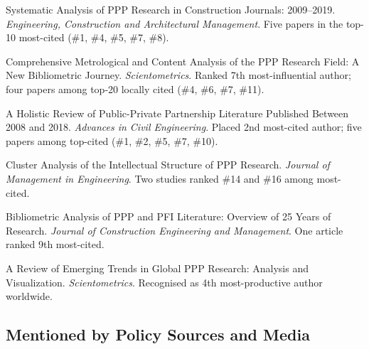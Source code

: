\documentclass[11pt,a4paper]{report} %
\begin{document}
\begin{tablist}
        \item[2020] \tab{}Systematic Analysis of PPP Research in Construction Journals: 2009--2019. \textit{Engineering, Construction and Architectural Management}. Five papers in the top-10 most-cited (\#1, \#4, \#5, \#7, \#8).  
    
        \item[2020] \tab{}Comprehensive Metrological and Content Analysis of the PPP Research Field: A New Bibliometric Journey. \textit{Scientometrics}. Ranked 7th most-influential author; four papers among top-20 locally cited (\#4, \#6, \#7, \#11).  
    
        \item[2019] \tab{}A Holistic Review of Public-Private Partnership Literature Published Between 2008 and 2018. \textit{Advances in Civil Engineering}. Placed 2nd most-cited author; five papers among top-cited (\#1, \#2, \#5, \#7, \#10).  
    
        \item[2019] \tab{}Cluster Analysis of the Intellectual Structure of PPP Research. \textit{Journal of Management in Engineering}. Two studies ranked \#14 and \#16 among most-cited.  
    
        \item[2016] \tab{}Bibliometric Analysis of PPP and PFI Literature: Overview of 25 Years of Research. \textit{Journal of Construction Engineering and Management}. One article ranked 9th most-cited.  
    
        \item[2016] \tab{}A Review of Emerging Trends in Global PPP Research: Analysis and Visualization. \textit{Scientometrics}. Recognised as 4th most-productive author worldwide.  
    
    \end{tablist}

    \subsection*{Mentioned by Policy Sources and Media}
    
\end{document}
